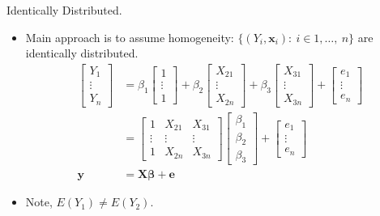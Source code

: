 \documentclass[aspectratio=169, handout]{beamer}
\numberwithin{equation}{section}
\begin{document}
\begin{frame}{Identically Distributed.}
\begin{itemize}
\item Main approach is to assume homogeneity: $\{(Y_i, \bm{x}_i):\ i\in1,\ldots,\ n\}$ are identically distributed.
\begin{align*}
\begin{bmatrix}Y_1\\ \vdots \\Y_n\end{bmatrix}&=\beta_1\begin{bmatrix}1 \\\vdots\\1\end{bmatrix}+\beta_2 \begin{bmatrix}X_{21} \\ \vdots \\ X_{2n}\end{bmatrix}+\beta_3 \begin{bmatrix}X_{31} \\\vdots\\ X_{3n} \end{bmatrix}+\begin{bmatrix}e_1 \\ \vdots \\ e_n\end{bmatrix}
\\
&=\begin{bmatrix}1 &X_{21}& X_{31} \\\vdots &\vdots& \vdots  \\1  &X_{2n}& X_{3n} \end{bmatrix} \begin{bmatrix} \beta_1\\ \beta_2 \\ \beta_3 \end{bmatrix}+\begin{bmatrix}e_1 \\ \vdots \\ e_n\end{bmatrix}\\
\bm{y}&=\bm{X}\bm{\beta}+\bm{e}
\end{align*}
\item Note, $E(Y_1)\neq E(Y_2)$.
\end{itemize}
\end{frame}
\end{document}
